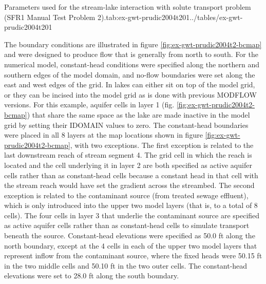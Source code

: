 \begin{StandardTable}{Parameters used for the stream-lake interaction with solute transport problem (SFR1 Manual Test Problem 2).}{tab:ex-gwt-prudic2004t201}{../tables/ex-gwt-prudic2004t201}
\end{StandardTable}

The boundary conditions are illustrated in figure \ref{fig:ex-gwt-prudic2004t2-bcmap} and were designed to produce flow that is generally from north to south. For the numerical model, constant-head conditions were specified along the northern and southern edges of the model domain, and no-flow boundaries were set along the east and west edges of the grid. In \mf lakes can either sit on top of the model grid, or they can be incised into the model grid as is done with previous MODFLOW versions.  For this example, aquifer cells in layer 1 (fig. \ref{fig:ex-gwt-prudic2004t2-bcmap}) that share the same space as the lake are made inactive in the model grid by setting their IDOMAIN values to zero. The constant-head boundaries were placed in all 8 layers at the map locations shown in figure \ref{fig:ex-gwt-prudic2004t2-bcmap}, with two exceptions.  The first exception is related to the last downstream reach of stream segment 4. The grid cell in which the reach is located and the cell underlying it in layer 2 are both specified as active aquifer cells rather than as constant-head cells because a constant head in that cell with the stream reach would have set the gradient across the streambed. The second exception is related to the contaminant source (from treated sewage effluent), which is only introduced into the upper two model layers (that is, to a total of 8 cells). The four cells in layer 3 that underlie the contaminant source are specified as active aquifer cells rather than as constant-head cells to simulate transport beneath the source. Constant-head elevations were specified as 50.0 ft along the north boundary, except at the 4 cells in each of the upper two model layers that represent inflow from the contaminant source, where the fixed heads were 50.15 ft in the two middle cells and 50.10 ft in the two outer cells. The constant-head elevations were set to 28.0 ft along the south boundary. 

